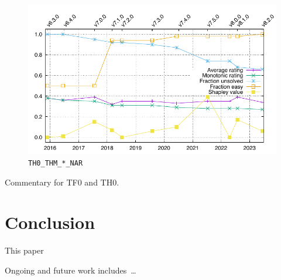 \documentclass[runningheads]{llncs}
\begin{document}
\begin{figure}[ht!]
\centering
\begin{minipage}[t]{.49\textwidth}
  \centering
  \includegraphics[width=\textwidth]{Plots/GNUPlots/TH0_THM_NAR.pdf}
  \vspace*{-2em}
  \caption{{\tt TH0\_THM\_*\_NAR}}
  \label{Plot_TH0_THM_NAR}
\end{minipage}
\end{figure}

Commentary for TF0 and TH0.

\section{Conclusion}
\label{Conclusion}

This paper 

Ongoing and future work includes~\ldots



\end{document}
